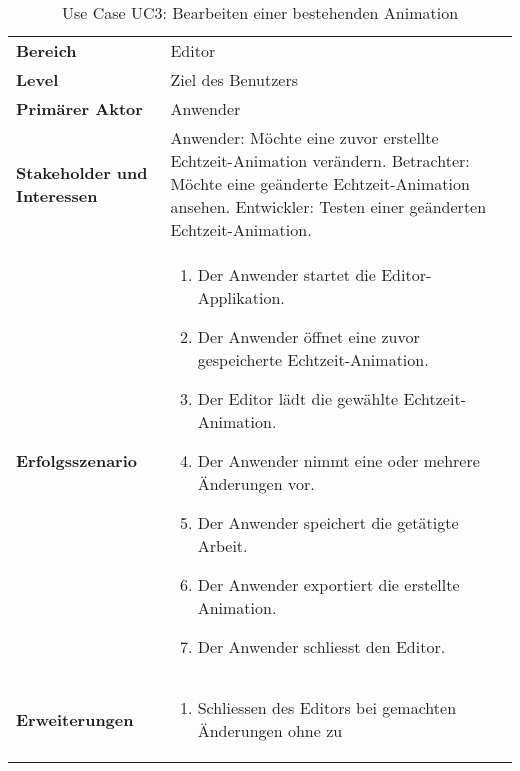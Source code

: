 
\begin{table}[H]
    \centering
    \caption{Use Case UC3: Bearbeiten einer bestehenden Animation}\label{table:uc3-edit-demo}
    \begin{tabular}{p{}p{}}
        \toprule
            \textbf{Bereich} &
            Editor \\
        \cmidrule(r){1-1}\cmidrule(lr){2-2}
            \textbf{Level} &
            Ziel des Benutzers \\
        \cmidrule(r){1-1}\cmidrule(lr){2-2}
            \textbf{Primärer Aktor} &
            Anwender \\
        \cmidrule(r){1-1}\cmidrule(lr){2-2}
            \textbf{Stakeholder und Interessen} &
            Anwender: Möchte eine zuvor erstellte Echtzeit-Animation verändern. \newline
            Betrachter: Möchte eine geänderte Echtzeit-Animation ansehen. \newline
            Entwickler: Testen einer geänderten Echtzeit-Animation. \\
        \cmidrule(r){1-1}\cmidrule(lr){2-2}
            \textbf{Erfolgsszenario} &
            \begin{enumerate}
                \item{Der Anwender startet die Editor-Applikation.}
                    \item{Der Anwender öffnet eine zuvor gespeicherte
                            Echtzeit-Animation.}
                \item{Der Editor lädt die gewählte Echtzeit-Animation.}
                \item{Der Anwender nimmt eine oder mehrere Änderungen vor.}
                \item{Der Anwender speichert die getätigte Arbeit.}
                \item{Der Anwender exportiert die erstellte Animation.}
                \item{Der Anwender schliesst den Editor.}
            \end{enumerate} \\
        \cmidrule(r){1-1}\cmidrule(lr){2-2}
            \textbf{Erweiterungen} &
            \begin{enumerate}[label= (\alph*)]
                \item{Schliessen des Editors bei gemachten Änderungen ohne zu
}
\end{enumerate}
\end{tabular}
\end{table}
